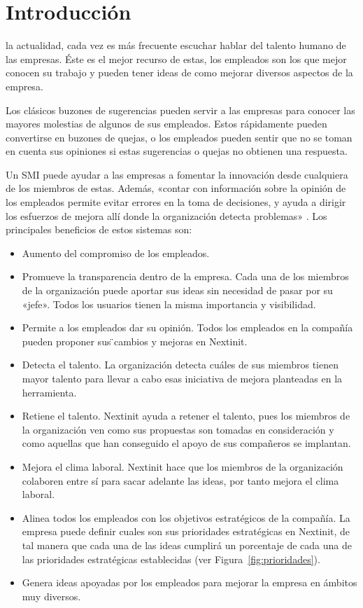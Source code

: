 \chapter{Introducción}

 la actualidad, cada vez es más frecuente escuchar hablar del talento humano de las empresas. Éste es el mejor recurso de estas,
 los empleados son los que mejor conocen su trabajo y pueden tener ideas de como mejorar diversos aspectos de la empresa. 
 
 Los clásicos buzones de sugerencias pueden servir a las empresas para conocer las mayores molestias de
  algunos de sus empleados. Estos rápidamente pueden convertirse en buzones de quejas, o los empleados pueden
   sentir que no se toman en cuenta sus opiniones si estas  sugerencias o quejas no obtienen una respuesta.
 
 Un \acf{SMI} puede ayudar a las empresas a fomentar la innovación desde cualquiera de los miembros de 
 estas. Además, «contar con información sobre la opinión de los empleados permite evitar errores en la toma
  de decisiones, y ayuda a dirigir los esfuerzos de mejora allí donde la organización detecta problemas»
   \cite{talento}. Los principales beneficios de estos sistemas son:
 
 \begin{itemize}
 	\item Aumento del compromiso de los empleados. 
 	\item Promueve la transparencia dentro de la empresa. Cada una de los miembros de la organización
 	puede aportar sus ideas sin necesidad de pasar por 	su «jefe». Todos los usuarios tienen la misma
 	 importancia y visibilidad.
 	\item Permite a los empleados dar su opinión. Todos los empleados en la compañía pueden proponer sus  ̈cambios y mejoras en Nextinit.
 	\item Detecta el talento. La organización detecta cuáles de sus miembros tienen
 	mayor talento para llevar a cabo esas iniciativa de mejora planteadas en la herramienta.
 	\item Retiene el talento. Nextinit ayuda a retener el talento, pues los miembros de la organización
 	 ven como sus propuestas son tomadas en consideración y como aquellas que han conseguido el apoyo de
 	  sus compañeros se implantan.
 	\item Mejora el clima laboral. Nextinit hace que los miembros de la organización colaboren entre sí 
 	para sacar adelante las ideas, por tanto mejora el clima laboral.
 	\item Alinea todos los empleados con los objetivos estratégicos de la compañía. La empresa puede definir cuales son sus prioridades estratégicas en Nextinit, de tal manera que cada una de las ideas 
 	cumplirá un porcentaje de cada una de las prioridades estratégicas establecidas (ver Figura~\ref{fig:prioridades}).
 	\item Genera ideas apoyadas por los empleados para mejorar la empresa en ámbitos muy diversos.
 \end{itemize}


